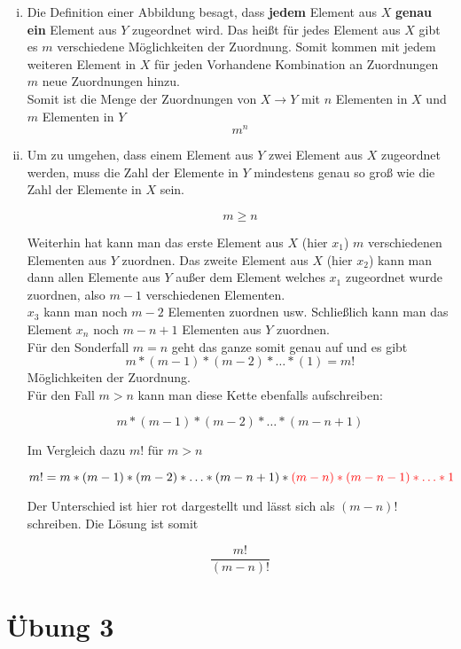 \documentclass{article}
\begin{document}
\begin{enumerate}[(i)]
\item Die Definition einer Abbildung besagt, dass \textbf{jedem} Element aus $X$ \textbf{genau ein} Element aus $Y$
  zugeordnet wird.
  Das heißt für jedes Element aus $X$ gibt es $m$ verschiedene Möglichkeiten der Zuordnung.
  Somit kommen mit jedem weiteren Element in $X$ für jeden Vorhandene Kombination an Zuordnungen $m$
  neue Zuordnungen hinzu. \\

  Somit ist die Menge der Zuordnungen von $X \to Y$ mit $n$ Elementen in $X$ und $m$ Elementen in $Y$
  \[
    m^n
  \]

\item Um zu umgehen, dass einem Element aus $Y$ zwei Element aus $X$ zugeordnet werden, muss die Zahl der Elemente
  in $Y$ mindestens genau so groß wie die Zahl der Elemente in $X$ sein.

  \[
    m \geq n
  \]

  Weiterhin hat kann man das erste Element aus $X$ (hier $x_1$) $m$ verschiedenen Elementen aus $Y$ zuordnen.
  Das zweite Element aus $X$ (hier $x_2$) kann man dann allen Elemente aus $Y$ außer dem Element welches $x_1$
  zugeordnet wurde zuordnen, also $m - 1$ verschiedenen Elementen. \\

  $x_3$ kann man noch $m - 2$ Elementen zuordnen usw. Schließlich kann man das Element $x_n$ noch $m - n + 1$
  Elementen aus $Y$ zuordnen. \\

  Für den Sonderfall $m = n$ geht das ganze somit genau auf und es gibt
  \[
    m * (m - 1) * (m - 2) * \dots * (1) = m!
  \]
  Möglichkeiten der Zuordnung. \\

  Für den Fall $m > n$ kann man diese Kette ebenfalls aufschreiben:

  \[
    m * (m - 1) * (m - 2) * \ldots * (m - n + 1) 
  \]

  Im Vergleich dazu $m!$ für $m > n$

  \[
    m! = m * (m - 1) * (m - 2) * \ldots * (m - n + 1) * \color{red} (m - n) * (m - n - 1) * \ldots * 1
  \]

  Der Unterschied ist hier rot dargestellt und lässt sich als $(m - n)!$ schreiben.
  Die Lösung ist somit

  \[
    \frac{m!}{(m - n)!}
  \]
\end{enumerate}

\section*{Übung 3}
\end{document}
